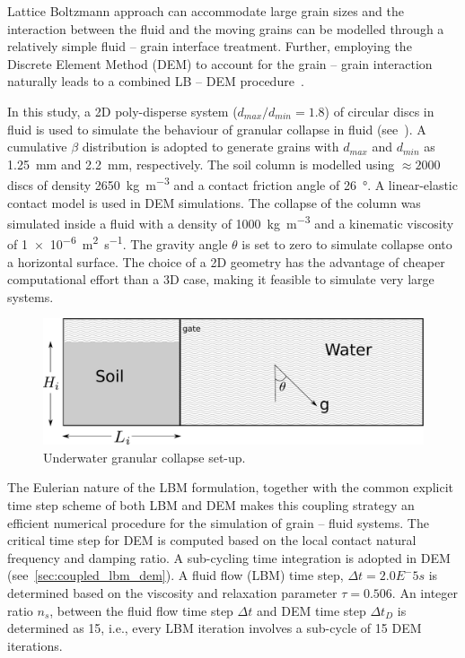 Lattice Boltzmann approach can accommodate large grain sizes and the 
interaction between the fluid and the moving grains can be modelled through 
a relatively simple fluid – grain interface treatment. Further, employing the 
Discrete Element Method (DEM) to account for the grain – grain interaction 
naturally leads to a combined LB – DEM procedure~\citep{Mansouri2009}. 

In this study, a 2D poly-disperse system ($d_{max}/d_{min} = 1.8$) of circular 
discs in fluid is used to simulate the behaviour of granular collapse in 
fluid (see~). A cumulative $\beta$ distribution is adopted 
to generate grains with $d_{max}$ and $d_{min}$ as 1.25~\si{\mm} and 
2.2~\si{\mm}, respectively. The soil column is modelled using 
$\approx 2000$ discs of density \SI{2650}{\kg\per\cubic\meter} and a contact 
friction angle of \SI{26}{\degree}. A linear-elastic contact model is used in 
DEM simulations. The collapse of the column was simulated inside a fluid with a 
density of \SI{1000}{\kg\per\cubic\meter}  and a kinematic viscosity of 
\SI{1e-6}{\square\meter\per\second}. The gravity angle $\theta$ is set to 
zero to simulate collapse onto a horizontal surface. The choice of a 2D 
geometry has the advantage of cheaper computational effort than a 3D case, 
making it feasible to simulate very large systems. 

\begin{figure}[htpb]
\centering
\includegraphics[width=0.97\columnwidth]{geometry}
\caption{Underwater granular collapse set-up.}
\label{fig:geometry}
\end{figure}

The Eulerian nature of the LBM formulation, together with the common explicit 
time step scheme of both LBM and DEM makes this coupling strategy an efficient 
numerical procedure for the simulation of grain – fluid systems. The critical 
time step for DEM is computed based on the local contact natural frequency and 
damping ratio. A sub-cycling time integration is adopted in DEM 
(see~\cref{sec:coupled_lbm_dem}). A fluid flow (LBM) time step, $\Delta t = 
2.0E^-5s$ is determined based on the viscosity and relaxation parameter $\tau = 
0.506$. An integer ratio $n_s$, between the fluid flow time step $\Delta t$ and 
DEM time step $\Delta t_D$ is determined as 15, i.e., every LBM iteration 
involves a sub-cycle of 15 DEM iterations.

